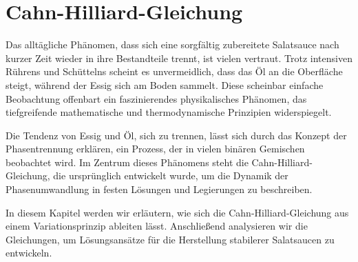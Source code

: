 %
%
%
%
\newcommand{\di}[2][]{\,\dd[#1]{#2}}
\newcommand{\deriv}[3][]{\frac{\dd[#1]{#2}}{\dd[]{#3^{#1}}}}
\newcommand{\pderiv}[3][]{\frac{\partial^{#1} #2}{\partial #3^{#1}}}
\newcommand{\energy}{\mathcal{E}}
\newcommand{\flux}{{\vec{\jmath}}}

\chapter{Cahn-Hilliard-Gleichung\label{chapter:cahnhilliard}}
\begin{refsection}

Das alltägliche Phänomen,
dass sich eine sorgfältig zubereitete Salatsauce
nach kurzer Zeit wieder in ihre Bestandteile trennt,
ist vielen vertraut.
Trotz intensiven Rührens und Schüttelns scheint es unvermeidlich,
dass das Öl an die Oberfläche steigt,
während der Essig sich am Boden sammelt.
Diese scheinbar einfache Beobachtung offenbart ein faszinierendes physikalisches Phänomen,
das tiefgreifende mathematische und thermodynamische Prinzipien widerspiegelt.

Die Tendenz von Essig und Öl,
sich zu trennen,
lässt sich durch das Konzept der Phasentrennung erklären,
ein Prozess,
der in vielen binären Gemischen beobachtet wird.
Im Zentrum dieses Phänomens steht die Cahn-Hilliard-Gleichung,
die ursprünglich entwickelt wurde,
um die Dynamik der Phasenumwandlung in festen Lösungen und Legierungen zu beschreiben.

In diesem Kapitel werden wir erläutern,
wie sich die Cahn-Hilliard-Gleichung aus einem Variationsprinzip ableiten lässt.
Anschließend analysieren wir die Gleichungen,
um Lösungsansätze für die Herstellung stabilerer Salatsaucen zu entwickeln.





\printbibliography[heading=subbibliography]
\end{refsection}
